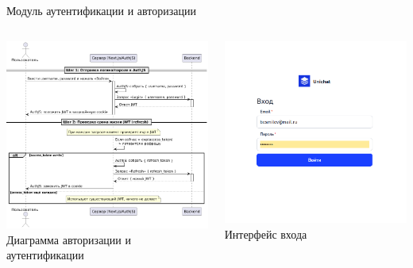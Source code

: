 \documentclass[aspectratio=169]{beamer}
\begin{document}
\begin{frame}{Модуль аутентификации и авторизации}
\small

\begin{columns}
    \begin{column}{0.5\textwidth}
        \centering
        \includegraphics[width=0.95\linewidth]{static/AuthRefresh.png} \\
        \small Диаграмма авторизации и аутентификации
    \end{column}
    \begin{column}{0.5\textwidth}
        \centering
        \includegraphics[width=0.95\linewidth]{static/LoginPage.png} \\
        \small Интерфейс входа
    \end{column}
\end{columns}
\end{frame}
\end{document}
